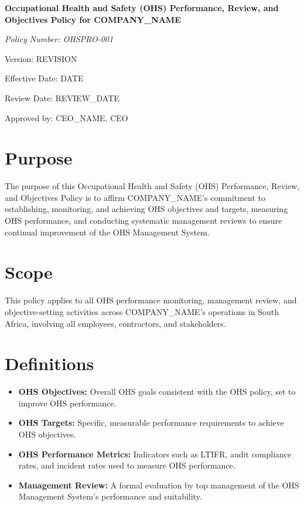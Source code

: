 \documentclass[12pt]{article}
\begin{document}
\begin{titlepage}
    \centering
    \vspace*{2cm}
    {\LARGE\bfseries Occupational Health and Safety (OHS) Performance, Review, and Objectives Policy for {{COMPANY_NAME}}\par}
    \vspace{1cm}
    {\large\itshape Policy Number: OHSPRO-001\par}
    \vspace{0.5cm}
    {\normalsize Version: {{REVISION}}\par}
    \vspace{0.5cm}
    {\normalsize Effective Date: {{DATE}}\par}
    \vspace{0.5cm}
    {\normalsize Review Date: {{REVIEW_DATE}}\par}
    \vspace{2cm}
    {\normalsize Approved by: {{CEO_NAME}}, CEO\par}
\end{titlepage}

\section{Purpose}
The purpose of this Occupational Health and Safety (OHS) Performance, Review, and Objectives Policy is to affirm {{COMPANY_NAME}}'s commitment to establishing, monitoring, and achieving OHS objectives and targets, measuring OHS performance, and conducting systematic management reviews to ensure continual improvement of the OHS Management System.

\section{Scope}
This policy applies to all OHS performance monitoring, management review, and objective-setting activities across {{COMPANY_NAME}}’s operations in South Africa, involving all employees, contractors, and stakeholders.

\section{Definitions}
\begin{itemize}
    \item \textbf{OHS Objectives:} Overall OHS goals consistent with the OHS policy, set to improve OHS performance.
    \item \textbf{OHS Targets:} Specific, measurable performance requirements to achieve OHS objectives.
    \item \textbf{OHS Performance Metrics:} Indicators such as LTIFR, audit compliance rates, and incident rates used to measure OHS performance.
    \item \textbf{Management Review:} A formal evaluation by top management of the OHS Management System’s performance and suitability.
\end{itemize}
\end{document}
